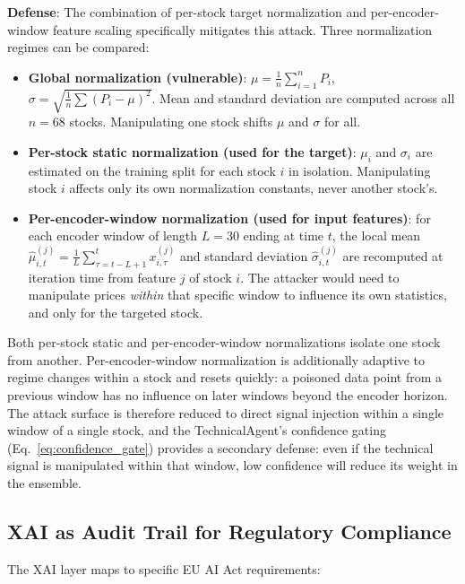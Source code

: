 \documentclass[conference]{IEEEtran}
\begin{document}
\textbf{Defense}: The combination of per-stock target normalization and per-encoder-window feature scaling specifically mitigates this attack. Three normalization regimes can be compared:
\begin{itemize}
\item \textbf{Global normalization (vulnerable)}: $\mu = \frac{1}{n} \sum_{i=1}^{n} P_i$, $\sigma = \sqrt{\frac{1}{n} \sum (P_i - \mu)^2}$. Mean and standard deviation are computed across all $n=68$ stocks. Manipulating one stock shifts $\mu$ and $\sigma$ for all.
\item \textbf{Per-stock static normalization (used for the target)}: $\mu_i$ and $\sigma_i$ are estimated on the training split for each stock $i$ in isolation. Manipulating stock $i$ affects only its own normalization constants, never another stock's.
\item \textbf{Per-encoder-window normalization (used for input features)}: for each encoder window of length $L=30$ ending at time $t$, the local mean $\hat{\mu}_{i,t}^{(j)} = \frac{1}{L} \sum_{\tau=t-L+1}^{t} x_{i,\tau}^{(j)}$ and standard deviation $\hat{\sigma}_{i,t}^{(j)}$ are recomputed at iteration time from feature $j$ of stock $i$. The attacker would need to manipulate prices \emph{within} that specific window to influence its own statistics, and only for the targeted stock.
\end{itemize}

Both per-stock static and per-encoder-window normalizations isolate one stock from another. Per-encoder-window normalization is additionally adaptive to regime changes within a stock and resets quickly: a poisoned data point from a previous window has no influence on later windows beyond the encoder horizon. The attack surface is therefore reduced to direct signal injection within a single window of a single stock, and the TechnicalAgent's confidence gating (Eq.~\ref{eq:confidence_gate}) provides a secondary defense: even if the technical signal is manipulated within that window, low confidence will reduce its weight in the ensemble.

\subsection{XAI as Audit Trail for Regulatory Compliance}

The XAI layer maps to specific EU AI Act requirements:
\end{document}
